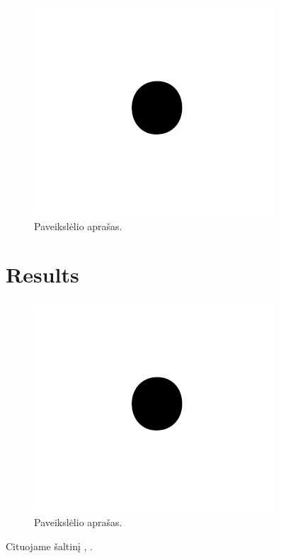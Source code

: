 \documentclass[conference]{IEEEtran}
\begin{document}
\begin{figure}[!h] %
\centerline{\includegraphics{fig1.png}}
\caption{Paveikslėlio aprašas.}
\label{fig}
\end{figure}


\section{Results}

\begin{figure}[ht] %
\centerline{\includegraphics{fig1.png}}
\caption{Paveikslėlio aprašas.}
\label{fig}
\end{figure}

Cituojame šaltinį \cite{lecun2015deep}, \cite{desai2021redcaps}.

%
%
\printbibliography[heading=bibintoc]
\end{document}
